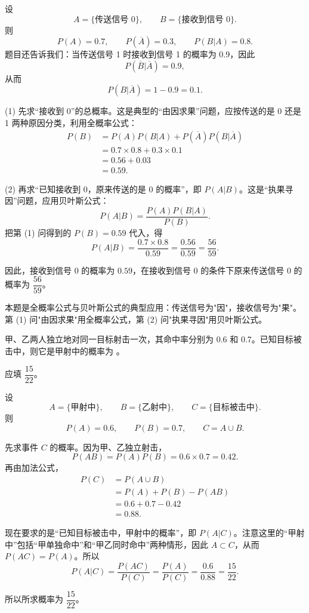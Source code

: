 ﻿\documentclass[lang=cn,11pt]{elegantbook}
\begin{document}
\begin{solution}
设
\[
A=\{\text{传送信号 }0\},\qquad B=\{\text{接收到信号 }0\}.
\]
则
\[
P(A)=0.7,\qquad P(\overline A)=0.3,\qquad P(B|A)=0.8.
\]
题目还告诉我们：当传送信号 1 时接收到信号 1 的概率为 \(0.9\)，因此
\[
P(\overline B|\overline A)=0.9,
\]
从而
\[
P(B|\overline A)=1-0.9=0.1.
\]

(1) 先求“接收到 0”的总概率。这是典型的“由因求果”问题，应按传送的是 0 还是 1 两种原因分类，利用全概率公式：
\[
\begin{aligned}
P(B)
&=P(A)P(B|A)+P(\overline A)P(B|\overline A)\\
&=0.7\times 0.8+0.3\times 0.1\\
&=0.56+0.03\\
&=0.59.
\end{aligned}
\]

(2) 再求“已知接收到 0，原来传送的是 0 的概率”，即 \(P(A|B)\)。这是“执果寻因”问题，应用贝叶斯公式：
\[
P(A|B)=\frac{P(A)P(B|A)}{P(B)}.
\]
把第 (1) 问得到的 \(P(B)=0.59\) 代入，得
\[
P(A|B)=\frac{0.7\times 0.8}{0.59}=\frac{0.56}{0.59}=\frac{56}{59}.
\]

因此，接收到信号 0 的概率为 \(0.59\)，在接收到信号 0 的条件下原来传送信号 0 的概率为 \(\dfrac{56}{59}\)。
\end{solution}

\begin{note}
本题是全概率公式与贝叶斯公式的典型应用：传送信号为"因"，接收信号为"果"。第 (1) 问"由因求果"用全概率公式，第 (2) 问"执果寻因"用贝叶斯公式。
\end{note}

\begin{exercise}\label{exer:1-39}
甲、乙两人独立地对同一目标射击一次，其命中率分别为 0.6 和 0.7。已知目标被击中，则它是甲射中的概率为 \underline{\hspace{2cm}}。
\end{exercise}

\begin{solution}
应填 \(\dfrac{15}{22}\)。

设
\[
A=\{\text{甲射中}\},\qquad B=\{\text{乙射中}\},\qquad C=\{\text{目标被击中}\}.
\]
则
\[
P(A)=0.6,\qquad P(B)=0.7,\qquad C=A\cup B.
\]

先求事件 \(C\) 的概率。因为甲、乙独立射击，
\[
P(AB)=P(A)P(B)=0.6\times 0.7=0.42.
\]
再由加法公式，
\[
\begin{aligned}
P(C)
&=P(A\cup B)\\
&=P(A)+P(B)-P(AB)\\
&=0.6+0.7-0.42\\
&=0.88.
\end{aligned}
\]

现在要求的是“已知目标被击中，甲射中的概率”，即 \(P(A|C)\)。注意这里的“甲射中”包括“甲单独命中”和“甲乙同时命中”两种情形，因此 \(A\subset C\)，从而 \(P(AC)=P(A)\)。所以
\[
P(A|C)=\frac{P(AC)}{P(C)}=\frac{P(A)}{P(C)}=\frac{0.6}{0.88}=\frac{15}{22}.
\]

所以所求概率为 \(\dfrac{15}{22}\)。
\end{solution}
\end{document}
